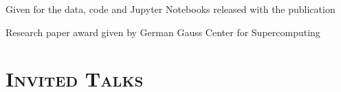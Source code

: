 \begin{resume}
  \begin{position}
    Given for the data, code and Jupyter Notebooks released with the publication
  \end{position}

  \begin{position}
    Research paper award given by German Gauss Center for Supercomputing
  \end{position}









  \section{\textsc{Invited Talks}}


\end{resume}
